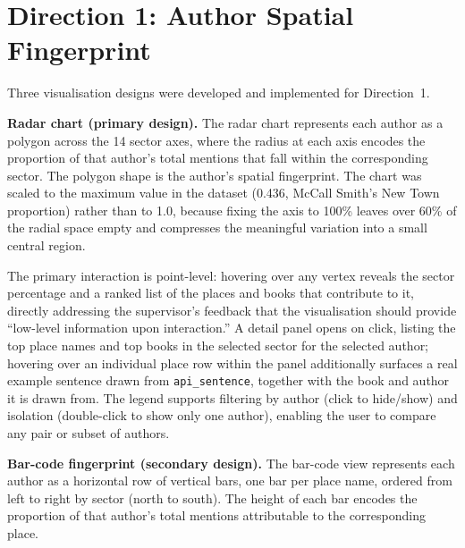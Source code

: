 \documentclass[logo,msc]{infthesis}
\begin{document}
\section{Direction 1: Author Spatial Fingerprint}
 
Three visualisation designs were developed and implemented for Direction~1.
 
\textbf{Radar chart (primary design).} The radar chart represents each author as a polygon across the 14 sector axes, where the radius at each axis encodes the proportion of that author's total mentions that fall within the corresponding sector. The polygon shape is the author's spatial fingerprint. The chart was scaled to the maximum value in the dataset (0.436, McCall Smith's New Town proportion) rather than to 1.0, because fixing the axis to 100\% leaves over 60\% of the radial space empty and compresses the meaningful variation into a small central region.
 
The primary interaction is point-level: hovering over any vertex reveals the sector percentage and a ranked list of the places and books that contribute to it, directly addressing the supervisor's feedback that the visualisation should provide ``low-level information upon interaction.'' A detail panel opens on click, listing the top place names and top books in the selected sector for the selected author; hovering over an individual place row within the panel additionally surfaces a real example sentence drawn from \texttt{api\_sentence}, together with the book and author it is drawn from. The legend supports filtering by author (click to hide/show) and isolation (double-click to show only one author), enabling the user to compare any pair or subset of authors.
 
\textbf{Bar-code fingerprint (secondary design).} The bar-code view represents each author as a horizontal row of vertical bars, one bar per place name, ordered from left to right by sector (north to south). The height of each bar encodes the proportion of that author's total mentions attributable to the corresponding place.
 
\end{document}
